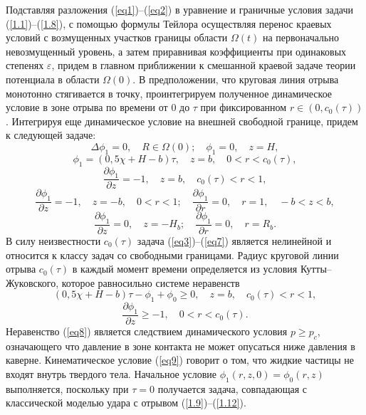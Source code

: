 \documentclass[press]{vestnik}
\begin{document}
Подставляя разложения (\ref{eq1})--(\ref{eq2}) в уравнение и граничные условия задачи 
(\ref{1.1})--(\ref{1.8}),  с помощью формулы Тейлора осуществляя перенос краевых 
условий с возмущенных участков границы области $\Omega (t)$ на первоначально 
невозмущенный уровень, а затем приравнивая коэффициенты при одинаковых 
степенях $\varepsilon $, придем в главном приближении к смешанной краевой 
задаче теории потенциала в области $\Omega (0)$. В предположении, что 
круговая линия отрыва монотонно стягивается в точку, проинтегрируем 
полученное динамическое условие в зоне отрыва по времени от $0$ до $\tau $ 
при фиксированном $r\in (0,c_{0} (\tau ))$. Интегрируя еще динамическое 
условие на внешней свободной границе, придем к следующей задаче:
\begin{equation}
\label{eq3}
\Delta \phi_{1} =0,
\quad
R\in \Omega (0);
\quad
\phi_{1} =0,
\quad
z=H,
\end{equation}
\begin{equation}
\label{eq4}
\phi_{1} =(0,5\chi +H-b)\tau ,
\quad
z=b,
\quad
0<r<c_{0} (\tau ),
\end{equation}
\begin{equation}
\label{eq5}
\frac{\partial \phi_{1} }{\partial z}=-1,
\quad
z=b,
\quad
c_{0} (\tau )<r<1,
\end{equation}
\begin{equation}
\label{eq6}
\frac{\partial \phi_{1} }{\partial z}=-1,
\quad
z=-b,
\quad
0<r<1;
\quad
\frac{\partial \phi_{1} }{\partial r}=0,
\quad
r=1,
\quad
-b<z<b,
\end{equation}
\begin{equation}
\label{eq7}
\frac{\partial \phi_{1} }{\partial z}=0,
\quad
z=-H_{b} ;
\quad
\frac{\partial \phi_{1} }{\partial r}=0,
\quad
r=R_{b} .
\end{equation}
В силу неизвестности $c_{0} (\tau )$ задача (\ref{eq3})--(\ref{eq7}) является 
нелинейной и относится к классу задач со свободными границами. Радиус 
круговой линии отрыва $c_{0} (\tau )$ в каждый момент времени определяется 
из условия Кутты--Жуковского, которое равносильно системе неравенств
\begin{equation}
\label{eq8}
(0,5\chi +H-b)\tau -\phi_{1} +\phi_{0} \ge 0,
\quad
z=b,
\quad
c_{0} (\tau )<r<1,
\end{equation}
\begin{equation}
\label{eq9}
\frac{\partial \phi_{1} }{\partial z}\geqslant -1,
\quad
0<r<c_{0} (\tau ).
\end{equation}
Неравенство (\ref{eq8}) является следствием динамического условия $p\geqslant p_{c} $, 
означающего что давление в зоне контакта не может опусаться ниже давления в 
каверне. Кинематическое условие (\ref{eq9}) говорит о том, что жидкие частицы не 
входят внутрь твердого тела. Начальное условие $\phi_{1} (r,z,0)=\phi_{0} 
(r,z)$ выполняется, поскольку при $\tau =0$ получается задача, совпадающая с 
классической моделью удара с отрывом (\ref{1.9})--(\ref{1.12}).
\end{document}

